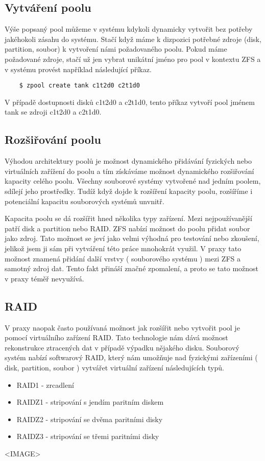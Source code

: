     \subsection{Vytváření poolu}
    Výše popsaný pool můžeme v systému kdykoli dynamicky vytvořit bez potřeby jakéhokoli zásahu do systému. Stačí když máme k dizpozici potřebné zdroje (disk, partition, soubor) k vytvoření námi požadovaného poolu. Pokud máme požadované zdroje, stačí už jen vybrat unikátní jméno pro pool v kontextu ZFS a v systému provést například následující příkaz.
    \begin{verbatim}
    $ zpool create tank c1t2d0 c2t1d0
    \end{verbatim}
    V případě dostupnosti disků c1t2d0 a c2t1d0, tento příkaz vytvoří pool jménem tank se zdroji  c1t2d0 a c2t1d0.
    \subsection{Rozšiřování poolu}
    Výhodou architektury poolů je možnost dynamického přidávání fyzických nebo virtuálních zařížení do poolu a tím získáváme možnost dynamického rozšiřování kapacity celého poolu.
    Všechny souborové systémy vytvořené nad jedním poolem, sdílejí jeho prostředky. Tudíž když dojde k rozšíření kapacity poolu, rozšíříme i potenciální kapacitu souborových systémů unvnitř.

    Kapacita poolu se dá rozšířit hned několika typy zařízení. Mezi nejpoužívanější patří disk a partition nebo RAID. ZFS nabízí možnost do poolu přidat soubor jako zdroj.
    Tato možnost se jeví jako velmi výhodná pro testování nebo zkoušení, jelikož jsem ji sám při vytváření této práce mnohokrát využil. V praxy tato možnost znamená přidání další
    vrstvy ( souborového systému ) mezi ZFS a samotný zdroj dat. Tento fakt přináší značné zpomalení, a proto se tato možnost v praxy téměř nevyužívá.
        
    \subsection{RAID}
    V praxy naopak často používaná možnost jak rozšířit nebo vytvořit pool je pomocí virtuálního zařízení RAID. Tato technologie nám dává možnost rekonstrukce ztracených dat v případě výpadku nějakého disku. Souborový systém nabízí softwarový RAID, který nám umožňuje nad fyzickými zařízeními ( disk, partition, soubor ) vytvářet virtuální zařízení následujících typů.
    \begin{itemize}
      \item RAID1 - zrcadlení
      \item RAIDZ1 - stripování s jendím paritním diskem
      \item RAIDZ2 - stripování se dvěma paritními disky
      \item RAIDZ3 - stripování se třemi paritními disky
    \end{itemize}
    <IMAGE>

